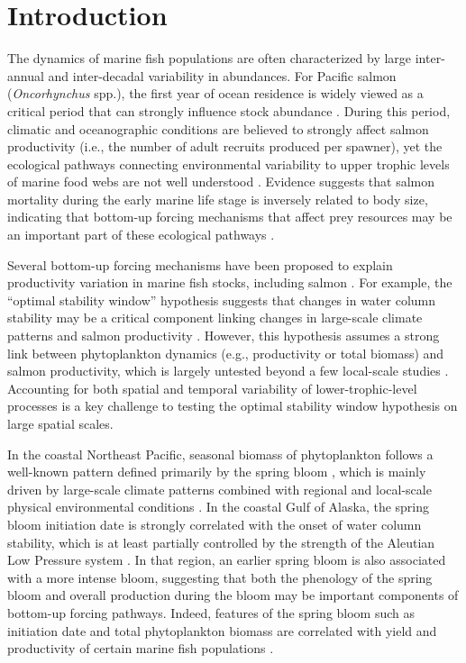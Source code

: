 \section{Introduction}

The dynamics of marine fish populations are often characterized by large
inter-annual and inter-decadal variability in abundances. For Pacific salmon
(\emph{Oncorhynchus} spp.), the first year of ocean residence is widely viewed
as a critical period that can strongly influence stock abundance
\citep{Peterman1985a, Parker1968a, Wertheimer2007a}. During this period,
climatic and oceanographic conditions are believed to strongly affect salmon
productivity (i.e., the number of adult recruits produced per spawner), yet the
ecological pathways connecting environmental variability to upper trophic levels
of marine food webs are not well understood \citep{Drinkwater2010a,
Ottersen2010a}. Evidence suggests that salmon mortality during the early marine
life stage is inversely related to body size, indicating that bottom-up forcing
mechanisms that affect prey resources may be an important part of these
ecological pathways \citep{McGurk1996a, Duffy2011, Farley2007b}.

Several bottom-up forcing mechanisms have been proposed to explain productivity
variation in marine fish stocks, including salmon \citep{Cushing1990a,
Gargett1997a}. For example, the ``optimal stability window'' hypothesis suggests
that changes in water column stability may be a critical component linking
changes in large-scale climate patterns and salmon productivity
\citep{Gargett1997a}. However, this hypothesis assumes a strong link between
phytoplankton dynamics (e.g., productivity or total biomass) and salmon
productivity, which is largely untested beyond a few local-scale studies
\citep{Mathews1989a, Chittenden2010a}.  Accounting for both spatial and temporal
variability of lower-trophic-level processes is a key challenge to testing the
optimal stability window hypothesis on large spatial scales.

In the coastal Northeast Pacific, seasonal biomass of phytoplankton follows a
well-known pattern defined primarily by the spring bloom \citep{Henson2007a,
Waite2013}, which is mainly driven by large-scale climate patterns combined with
regional and local-scale physical environmental conditions \citep{Sverdrup1953a,
Ware1991a, Polovina1995a, Henson2007a}. In the coastal Gulf of Alaska, the
spring bloom initiation date is strongly correlated with the onset of water
column stability, which is at least partially controlled by the strength of the
Aleutian Low Pressure system \citep{Henson2007a}. In that region, an earlier
spring bloom is also associated with a more intense bloom, suggesting that both
the phenology of the spring bloom and overall production during the bloom may be
important components of bottom-up forcing pathways. Indeed, features of the
spring bloom such as initiation date and total phytoplankton biomass are
correlated with yield and productivity of certain marine fish populations
\citep{Platt2003a, Ware2005a, Koeller2009}.

